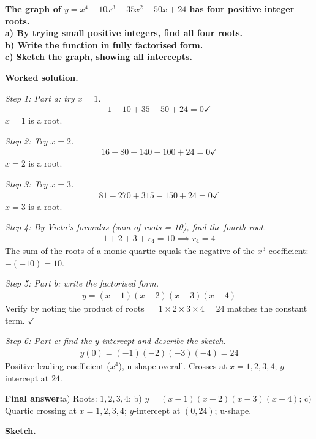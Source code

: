\documentclass[11pt]{article}
\newcommand{\question}[1]{\par\medskip\noindent\textbf{#1}\par}
\begin{document}
\question{The graph of \( y = x^4 - 10x^3 + 35x^2 - 50x + 24 \) has four positive integer roots. \\[3pt] a) By trying small positive integers, find all four roots. \\[3pt] b) Write the function in fully factorised form. \\[3pt] c) Sketch the graph, showing all intercepts.}

\textbf{Worked solution.}

\textit{Step 1: Part a: try \( x = 1 \).}
\[\begin{gathered}
1 - 10 + 35 - 50 + 24 = 0 \checkmark
\end{gathered}\]
\( x = 1 \) is a root.

\textit{Step 2: Try \( x = 2 \).}
\[\begin{gathered}
16 - 80 + 140 - 100 + 24 = 0 \checkmark
\end{gathered}\]
\( x = 2 \) is a root.

\textit{Step 3: Try \( x = 3 \).}
\[\begin{gathered}
81 - 270 + 315 - 150 + 24 = 0 \checkmark
\end{gathered}\]
\( x = 3 \) is a root.

\textit{Step 4: By Vieta's formulas (sum of roots = 10), find the fourth root.}
\[\begin{gathered}
1 + 2 + 3 + r_4 = 10 \implies r_4 = 4
\end{gathered}\]
The sum of the roots of a monic quartic equals the negative of the \( x^3 \) coefficient: \( -(-10) = 10 \).

\textit{Step 5: Part b: write the factorised form.}
\[\begin{gathered}
y = (x-1)(x-2)(x-3)(x-4)
\end{gathered}\]
Verify by noting the product of roots \( = 1 \times 2 \times 3 \times 4 = 24 \) matches the constant term. \( \checkmark \)

\textit{Step 6: Part c: find the \( y \)-intercept and describe the sketch.}
\[\begin{gathered}
y(0) = (-1)(-2)(-3)(-4) = 24
\end{gathered}\]
Positive leading coefficient (\( x^4 \)), u-shape overall. Crosses at \( x = 1, 2, 3, 4 \); \( y \)-intercept at \( 24 \).

\begin{answerbox}
\textbf{Final answer:}\quad a) Roots: \(\displaystyle 1, 2, 3, 4\); b) \(\displaystyle y = (x-1)(x-2)(x-3)(x-4)\); c) Quartic crossing at \(\displaystyle x = 1,2,3,4\); \(\displaystyle y\)-intercept at \(\displaystyle (0, 24)\); u-shape.
\end{answerbox}
\textbf{Sketch.}
\end{document}
